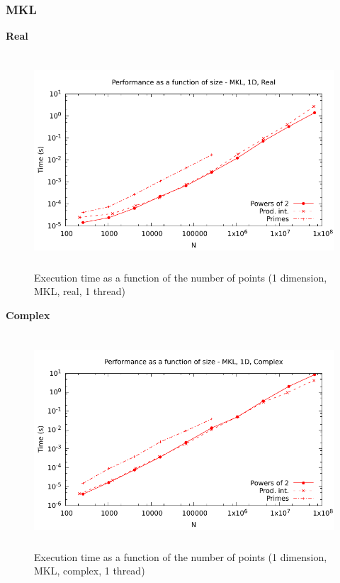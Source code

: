 \documentclass[12pt, a4paper]{article}
\begin{document}
\subsubsection{MKL}
{\bf Real}
\begin{figure}[H]
\captionsetup{width=0.6\textwidth}
\centering
\includegraphics[height=8cm]{graphs/performance/1d-mkl-r.pdf}
\caption{Execution time as a function of the number of points (1 dimension, MKL, real, 1 thread)}
\label{1DMKLR}
\end{figure}
{\bf Complex}
\begin{figure}[H]
\captionsetup{width=0.6\textwidth}
\centering
\includegraphics[height=8cm]{graphs/performance/1d-mkl-c.pdf}
\caption{Execution time as a function of the number of points (1 dimension, MKL, complex, 1 thread)}
\label{1DMKLC}
\end{figure}   
\end{document}

